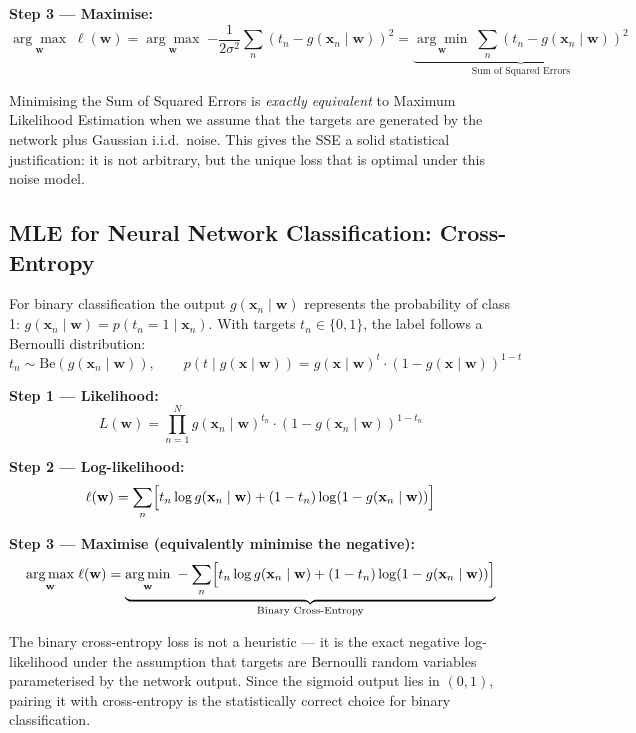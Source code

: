 \documentclass[11pt,a4paper]{article}
\begin{document}
\textbf{Step 3 — Maximise:}
\[
\underset{\mathbf{w}}{\arg\max}\;\ell(\mathbf{w}) = \underset{\mathbf{w}}{\arg\max}\;{-\frac{1}{2\sigma^2}\sum_n (t_n - g(\mathbf{x}_n \mid \mathbf{w}))^2}
= \underbrace{\underset{\mathbf{w}}{\arg\min}\;\sum_n (t_n - g(\mathbf{x}_n \mid \mathbf{w}))^2}_{\text{Sum of Squared Errors}}
\]

\begin{insightbox}[SSE loss = MLE under Gaussian noise assumption]
Minimising the Sum of Squared Errors is \emph{exactly equivalent} to Maximum Likelihood Estimation when we assume that the targets are generated by the network plus Gaussian i.i.d.\ noise. This gives the SSE a solid statistical justification: it is not arbitrary, but the unique loss that is optimal under this noise model.
\end{insightbox}

\subsection{MLE for Neural Network Classification: Cross-Entropy}

For binary classification the output $g(\mathbf{x}_n \mid \mathbf{w})$ represents the probability of class 1: $g(\mathbf{x}_n \mid \mathbf{w}) = p(t_n = 1 \mid \mathbf{x}_n)$. With targets $t_n \in \{0,1\}$, the label follows a Bernoulli distribution:
\[
t_n \sim \mathrm{Be}(g(\mathbf{x}_n \mid \mathbf{w})), \qquad
p(t \mid g(\mathbf{x} \mid \mathbf{w})) = g(\mathbf{x} \mid \mathbf{w})^t \cdot (1 - g(\mathbf{x} \mid \mathbf{w}))^{1-t}
\]

\textbf{Step 1 — Likelihood:}
\[
L(\mathbf{w}) = \prod_{n=1}^N g(\mathbf{x}_n \mid \mathbf{w})^{t_n} \cdot (1 - g(\mathbf{x}_n \mid \mathbf{w}))^{1-t_n}
\]

\textbf{Step 2 — Log-likelihood:}
\[
\ell(\mathbf{w}) = \sum_n \Bigl[ t_n \log g(\mathbf{x}_n \mid \mathbf{w}) + (1-t_n)\log(1 - g(\mathbf{x}_n \mid \mathbf{w})) \Bigr]
\]

\textbf{Step 3 — Maximise (equivalently minimise the negative):}
\[
\underset{\mathbf{w}}{\arg\max}\;\ell(\mathbf{w})
= \underbrace{\underset{\mathbf{w}}{\arg\min}\;
-\sum_n \Bigl[ t_n \log g(\mathbf{x}_n \mid \mathbf{w}) + (1-t_n)\log(1-g(\mathbf{x}_n \mid \mathbf{w})) \Bigr]}_{\text{Binary Cross-Entropy}}
\]

\begin{insightbox}[Cross-entropy loss = MLE under Bernoulli assumption]
The binary cross-entropy loss is not a heuristic — it is the exact negative log-likelihood under the assumption that targets are Bernoulli random variables parameterised by the network output. Since the sigmoid output lies in $(0,1)$, pairing it with cross-entropy is the statistically correct choice for binary classification.
\end{insightbox}
\end{document}
